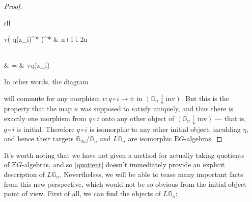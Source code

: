 \documentclass{amsart} %
\newenvironment{eq*}{\begin{equation*}}{\end{equation*}}
\begin{document}
\begin{proof}
\begin{eq*}
\begin{array}{rll}
\begin{cases}
      				v\big( q(z_i)^* \big)^* & \quad {} \quad n+1 \leq i \leq 2n \\
			\end{cases} \\
		& = & vq(z_i)
		\end{array}
\end{eq*}
In other words, the diagram
\begin{eq*}  \end{eq*}
will commute for any morphism $v: q \circ i \to \psi$ in $(\mathbb{G}_n \downarrow \mathrm{inv})$. But this is the property that the map $u$ was supposed to satisfy uniquely, and thus there is exactly one morphism from $q \circ i$ onto any other object of $(\mathbb{G}_n \downarrow \mathrm{inv})$ --- that is, $q \circ i$ is initial. Therefore $q \circ i$ is isomorphic to any other initial object, inculding $\eta$, and hence their targets $\mathbb{G}_{2n}/\mathbb{G}_n$ and $L\mathbb{G}_n$ are isomorphic $\mathrm{E}G$-algebras.
\end{proof}

It's worth noting that we have not given a method for actually taking quotients of $\mathrm{E}G$-algebras, and so \cref{quotient} doesn't immediately provide an explicit description of $L\mathbb{G}_n$. Nevertheless, we will be able to tease many important facts from this new perspective, which would not be so obvious from the initial object point of view. First of all, we can find the objects of $L\mathbb{G}_n$:
\end{document}
